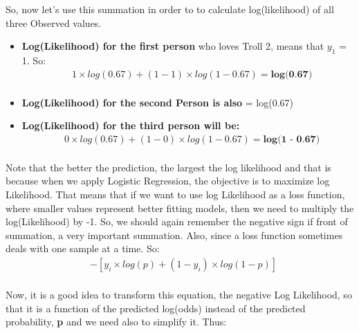 \documentclass[12pt, a4paper]{article} %
\begin{document}
So, now let's use this summation in order to to calculate log(likelihood) of all three Observed values.

\begin{itemize}
    \item \textbf{Log(Likelihood) for the first person} who loves Troll 2, means that $y_{1}$ = 1. So:
    \begin{align*}
        & 1 \times log(0.67) + (1 - 1) \times log(1 - 0.67) = \textbf{log(0.67)}\\
    \end{align*}
    
    \item \textbf{Log(Likelihood) for the second Person is also} = log(0.67)
    
    \item \textbf{Log(Likelihood) for the third person will be:}
    \begin{align*}
        & 0 \times log(0.67) + (1 - 0) \times log(1 - 0.67) = \textbf{log(1 - 0.67)}\\
    \end{align*}
\end{itemize}

Note that the better the prediction, the largest the log likelihood and that is because when we apply Logistic Regression, the objective is to maximize log Likelihood. That means that if we want to use log Likelihood as a loss function, where smaller values represent better fitting models, then we need to multiply the log(Likelihood) by -1. So, we should again remember the negative sign if front of summation, a very important summation. Also, since a loss function sometimes deals with one sample at a time. So:
\begin{align*}
    & -[y_{i} \times log(p) + (1 - y_{i}) \times log(1 - p)]\\
\end{align*}

Now, it is a good idea to transform this equation, the negative Log Likelihood, so that it is a function of the predicted log(odds) instead of the predicted probability, \textbf{p} and we need also to simplify it. Thus:
\end{document}
